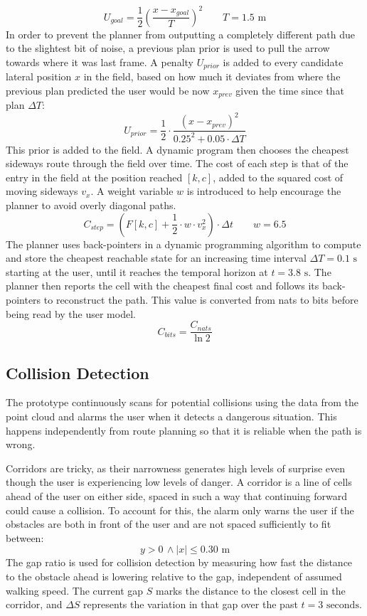 \documentclass[a4paper]{article}
\begin{document}
$$
U_{goal}=\frac{1}{2} \left( \frac{x-x_{goal}}{T} \right)^2 \qquad T = 1.5 \text{ m}
$$
In order to prevent the planner from outputting a completely different path due to the slightest bit of noise, a previous plan prior is used to pull the arrow towards where it was last frame. A penalty $U_{prior}$ is added to every candidate lateral position $x$ in the field, based on how much it deviates from where the previous plan predicted the user would be now $x_{prev}$ given the time since that plan $\Delta T$:
$$
U_{prior} = \frac{1}{2}\cdot \frac{(x-x_{prev})^2}{0.25^2 + 0.05 \cdot \Delta T}
$$
This prior is added to the field. A dynamic program then chooses the cheapest sideways route through the field over time. The cost of each step is that of the entry in the field at the position reached $[k,c]$, added to the squared cost of moving sideways $v_{x}$. A weight variable $w$ is introduced to help encourage the planner to avoid overly diagonal paths.
$$
C_{step} = \left( F[k,c] + \frac{1}{2} \cdot w\cdot v_{x}^2 \right)\cdot \Delta t
\qquad
w = 6.5
$$
The planner uses back-pointers in a dynamic programming algorithm to compute and store the cheapest reachable state for an increasing time interval $\Delta T=0.1\text{ s}$ starting at the user, until it reaches the temporal horizon at $t=3.8 \text{ s}$. The planner then reports the cell with the cheapest final cost and follows its back-pointers to reconstruct the path. This value is converted from nats to bits before being read by the user model.
$$
C_{bits} = \frac{C_{nats}}{\ln 2}
$$
\subsection{Collision Detection} \label{collision-detection}
The prototype continuously scans for potential collisions using the data from the point cloud and alarms the user when it detects a dangerous situation. This happens independently from route planning so that it is reliable when the path is wrong. 

Corridors are tricky, as their narrowness generates high levels of surprise even though the user is experiencing low levels of danger. A corridor is a line of cells ahead of the user on either side, spaced in such a way that continuing forward could cause a collision. To account for this, the alarm only warns the user if the obstacles are both in front of the user and are not spaced sufficiently to fit between: 
$$
y>0 \, \land |x| \le 0.30 \text{ m}
$$
The gap ratio is used for collision detection by measuring how fast the distance to the obstacle ahead is lowering relative to the gap, independent of assumed walking speed. The current gap $S$ marks the distance to the closest cell in the corridor, and $\Delta S$ represents the variation in that gap over the past $t = 3 \text{ seconds}$. 
\end{document}
